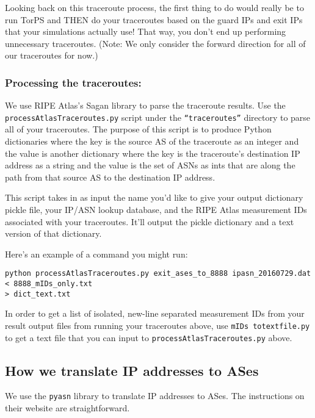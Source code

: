 \documentclass{article}
\begin{document}
\begin{itemize}
\end{itemize}

Looking back on this traceroute process, the first thing to do 
would really be to run TorPS and THEN 
do your traceroutes based on the guard IPs and exit IPs that your simulations 
actually use! That way, you don't end up performing unnecessary traceroutes. 
(Note: We only consider the forward direction for all of our 
traceroutes for now.)

\subsubsection{Processing the traceroutes:}
We use RIPE Atlas's Sagan library to parse the traceroute results. Use the 
{\tt processAtlasTraceroutes.py} script under the {\tt ``traceroutes''} directory 
to parse all of your traceroutes. The purpose of this script is to produce 
Python dictionaries where the key is the source AS of the traceroute as an 
integer and the value is another dictionary where the key is the traceroute's 
destination IP address as a string and the value is the set of ASNs as ints that 
are along the path from that source AS to the destination IP address. 

This script takes in as input the name 
you'd like to give your output dictionary pickle file, your IP/ASN lookup database, 
and the RIPE Atlas measurement IDs associated with your traceroutes. It'll output 
the pickle dictionary and a text version of that dictionary.

Here's an example of a command you might run:
\begin{lstlisting}
python processAtlasTraceroutes.py exit_ases_to_8888 ipasn_20160729.dat 
< 8888_mIDs_only.txt
> dict_text.txt
\end{lstlisting}

In order to get a list of isolated, new-line separated measurement IDs from your result 
output files from running your traceroutes above, use {\tt mIDs\textunderscore 
to\textunderscore text\textunderscore file.py} to get a text file that you can 
input to {\tt processAtlasTraceroutes.py} above.

\subsection{How we translate IP addresses to ASes}
We use the {\tt pyasn} library to translate IP addresses to ASes. The instructions 
on their website are straightforward.
\end{document}
